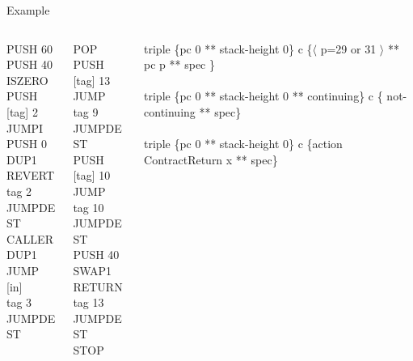 \documentclass{beamer}
\begin{document}
\begin{frame}{Example}
	\begin{columns}[l l l]
		\begin{column}{0.25\textwidth}
			   	PUSH 60\\ 
			   PUSH 40\\ 
			   ISZERO\\ 
			   PUSH [tag] 2\\ 
			   JUMPI\\ 
			   PUSH 0\\ 
			   DUP1\\ 
			   REVERT\\ 
			   tag 2\\ 
			   JUMPDEST\\ 
			   CALLER\\ 
			   DUP1\\ 
			   JUMP [in]\\ 
			   tag 3\\ 
			   JUMPDEST\\ 
		\end{column}
		\begin{column}{0.25\textwidth}
			  POP\\ 
			PUSH [tag] 13\\ 
			JUMP\\ 
			tag 9\\ 
			JUMPDEST\\ 
			PUSH [tag] 10\\ 
			JUMP\\ 
			tag 10\\ 
			JUMPDEST\\ 
			PUSH 40\\ 
			SWAP1\\ 
			RETURN\\ 
			tag 13\\ 
			JUMPDEST\\ 
			STOP
		\end{column}
		\begin{column}{0.5\textwidth}
			triple \{pc 0 ** stack-height 0\} c \{$\langle$ p=29 or 31 $\rangle$ ** pc p ** spec \}\\~\\
			triple \{pc 0 ** stack-height 0 ** continuing\} c \{ not-continuing ** spec\}\\~\\
			triple \{pc 0 ** stack-height 0\} c \{action ContractReturn x ** spec\}
		\end{column}
	\end{columns}
\end{frame}

\end{document}
